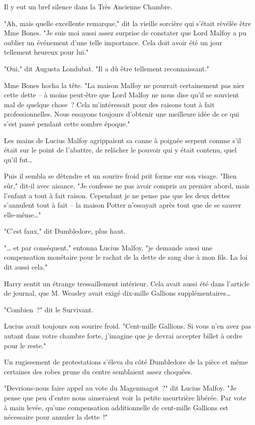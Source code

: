 Il y eut un bref silence dans la Très Ancienne Chambre.

"Ah, mais quelle excellente remarque," dit la vieille sorcière qui s'était révélée être Mme Bones. "Je suis moi aussi assez surprise de constater que Lord Malfoy a pu oublier un événement d'une telle importance. Cela doit avoir été un jour tellement heureux pour lui."

"Oui," dit Augusta Londubat. "Il a dû être tellement reconnaissant."

Mme Bones hocha la tête. "La maison Malfoy ne pourrait certainement pas nier cette dette -- à moins peut-être que Lord Malfoy ne nous dise qu'il se souvient mal de quelque chose~? Cela m'intéressait pour des raisons tout à fait professionnelles. Nous essayons toujours d'obtenir une meilleure idée de ce qui s'est passé pendant cette sombre époque."

Les mains de Lucius Malfoy agrippaient sa canne à poignée serpent comme s'il était sur le point de l'abattre, de relâcher le pouvoir qui y était contenu, quel qu'il fut…

Puis il sembla se détendre et un sourire froid prit forme sur son visage. "Bien sûr," dit-il avec aisance. "Je confesse ne pas avoir compris au premier abord, mais l'enfant a tout à fait raison. Cependant je ne pense pas que les deux dettes s'annulent tout à fait -- la maison Potter n'essayait après tout que de se sauver elle-même…"

"C'est faux," dit Dumbledore, plus haut.

"… et par conséquent," entonna Lucius Malfoy, "je demande aussi une compensation monétaire pour le rachat de la dette de sang due à mon fils. La loi dit aussi cela."

Harry sentit un étrange tressaillement intérieur. Cela avait aussi été dans l'article de journal, que M. Weasley avait exigé dix-mille Gallions supplémentaires…

"Combien~?" dit le Survivant.

Lucius avait toujours son sourire froid. "Cent-mille Gallions. Si vous n'en avez pas autant dans votre chambre forte, j'imagine que je devrai accepter billet à ordre pour le reste."

Un rugissement de protestations s'éleva du côté Dumbledore de la pièce et même certaines des robes prune du centre semblaient assez choquées.

"Devrions-nous faire appel au vote du Magenmagot~?" dit Lucius Malfoy. "Je pense que peu d'entre nous aimeraient voir la petite meurtrière libérée. Par vote à main levée, qu'une compensation additionnelle de cent-mille Gallions est nécessaire pour annuler la dette~!"

